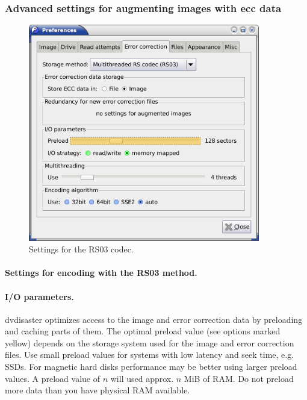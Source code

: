 \newpage
\subsubsection{Advanced settings for augmenting images with ecc data}
\label{howto-augment-advanced-settings}

\begin{figure}[h]
\centerline{\includegraphics[width=0.9\textwidth]{screenshots/augment-prefs-rs03-adv.png}}
\caption{Settings for the RS03 codec.}  
\label{howto-augmented-settings-rs03-adv}
\end{figure}

\paragraph{Settings for encoding with the RS03 method.}\quad

\paragraph{I/O parameters.} dvdisaster optimizes access to the image
and error correction data by preloading and caching parts of them.
The optimal preload value (see options marked yellow) depends on the
storage system used for the image and error correction files. Use
small preload values for systems with low latency and seek time,
e.g. SSDs. For magnetic hard disks performance may be better using
larger preload values. A preload value of $n$ will used approx. $n$ MiB
of RAM. Do not preload more data than you have physical RAM available.

